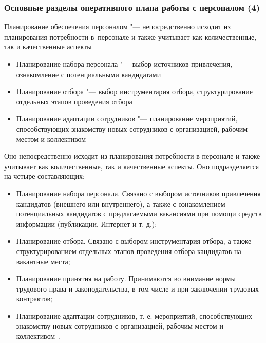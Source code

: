 \documentclass{../industrial-development}
\begin{document}
\begin{frame} \frametitle{Основные разделы оперативного плана работы с персоналом (4)}
	\alert{Планирование обеспечения персоналом} "--- непосредственно исходит из планирования потребности в~персонале и также учитывает как количественные, так и качественные аспекты
	\begin{itemize}
		\item {\small Планирование набора персонала "--- выбор источников привлечения, ознакомление с потенциальными кандидатами}
		\item {\small Планирование отбора "--- выбор инструментария отбора, структурирование отдельных этапов проведения отбора}
		\item {\small Планирование адаптации сотрудников "--- планирование мероприятий, способствующих знакомству новых сотрудников с организацией, рабочим местом и коллективом}
	\end{itemize}
\end{frame}

\lecturenotes

Оно непосредственно исходит из планирования потребности в персонале и также учитывает как количественные, так и качественные аспекты. Оно подразделяется на четыре составляющих:
\begin{itemize}
	\item Планирование набора персонала. Связано с выбором источников привлечения кандидатов (внешнего или внутреннего), а также с ознакомлением потенциальных кандидатов с предлагаемыми вакансиями при помощи средств информации (публикации, Интернет и т. д.);
	\item Планирование отбора. Связано с выбором инструментария отбора, а также структурированием отдельных этапов проведения отбора кандидатов на вакантные места;
	\item Планирование принятия на работу. Принимаются во внимание нормы трудового права и законодательства, в том числе и при заключении трудовых контрактов;
	\item Планирование адаптации сотрудников, т. е. мероприятий, способствующих знакомству новых сотрудников с организацией, рабочим местом и коллективом~\cite{Durakova}.
\end{itemize}
\end{document}
